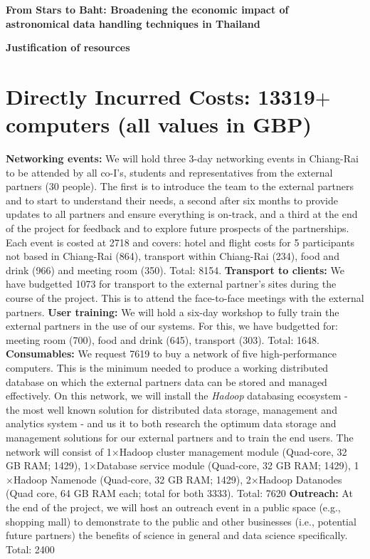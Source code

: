 \documentclass[11pt]{article}
\begin{document}
\setcounter{figure}{0}
\noindent
{\LARGE \bf From Stars to Baht: Broadening the economic impact of \\
astronomical data handling techniques in Thailand}

\vspace{3mm}
\noindent
{\LARGE \bf Justification of resources }
\vspace{-3mm}
\section{Directly Incurred Costs: 13319$+$ computers (all values in GBP)}
\vspace{-3mm}
{\bf Networking events:} We will hold three 3-day networking events in Chiang-Rai to be attended by all co-I's, students and representatives from the external partners (30 people). The first is to introduce the team to the external partners and to start to understand their needs, a second after six months to provide updates to all partners and ensure everything is on-track, and a third at the end of the project for feedback and to explore future prospects of the partnerships. Each event is costed at 2718 and covers: hotel and flight costs for 5 participants not based in Chiang-Rai (864), transport within Chiang-Rai (234), food and drink (966) and meeting room (350). Total: 8154. {\bf Transport to clients:} We have budgetted 1073 for transport to the external partner's sites during the course of the project. This is to attend the face-to-face meetings with the external partners. {\bf User training:} We will hold a six-day workshop to fully train the external partners in the use of our systems. For this, we have budgetted for: meeting room (700), food and drink (645), transport (303). Total: 1648. {\bf Consumables:} We request 7619 to buy a network of five high-performance computers. This is the minimum needed to produce a working distributed database on which the external partners data can be stored and managed effectively. On this network, we will install the {\it Hadoop} databasing ecosystem - the most well known solution for distributed data storage, management and analytics system - and us it to both research the optimum data storage and management solutions for our external partners and to train the end users. The network will consist of 1$\times$Hadoop cluster management module (Quad-core, 32 GB RAM; 1429), 1$\times$Database service module (Quad-core, 32 GB RAM; 1429), 1$\times$Hadoop Namenode (Quad-core, 32 GB RAM; 1429), 2$\times$Hadoop Datanodes (Quad core, 64 GB RAM each; total for both 3333). Total: 7620 {\bf Outreach:} At the end of the project, we will host an outreach event in a public space (e.g., shopping mall) to demonstrate to the public and other businesses (i.e., potential future partners) the benefits of science in general and data science specifically. Total: 2400
\end{document}
